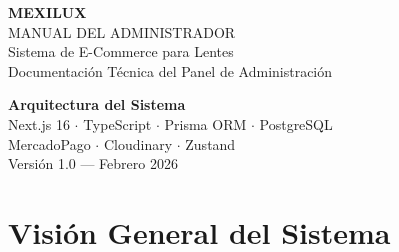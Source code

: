 \documentclass[12pt, a4paper]{article}
\begin{document}
\begin{titlepage}

\vspace*{2.5cm}

\begin{center}
    {\fontsize{42}{50}\selectfont\bfseries\color{white} MEXILUX}\\[0.4cm]
    {\fontsize{14}{18}\selectfont\color{mxgold} MANUAL DEL ADMINISTRADOR}\\[0.3cm]
    {\fontsize{11}{14}\selectfont\color{white!70} Sistema de E-Commerce para Lentes}\\[0.2cm]
    {\small\color{white!50} Documentaci\'{o}n T\'{e}cnica del Panel de Administraci\'{o}n}
\end{center}

\vspace{6.5cm}

\begin{center}
    {\large\color{mxdark}\bfseries Arquitectura del Sistema}\\[0.3cm]
    {\small\color{mxgray} Next.js 16 $\cdot$ TypeScript $\cdot$ Prisma ORM $\cdot$ PostgreSQL}\\[0.1cm]
    {\small\color{mxgray} MercadoPago $\cdot$ Cloudinary $\cdot$ Zustand}\\[1.5cm]
    {\footnotesize\color{mxgray} Versi\'{o}n 1.0 --- Febrero 2026}
\end{center}
\end{titlepage}

\newpage
\tableofcontents
\newpage

\section{Visi\'{o}n General del Sistema}
\end{document}

